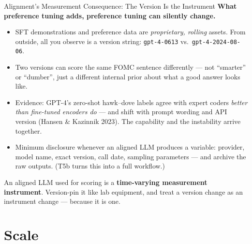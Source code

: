 \begin{frame}{Alignment's Measurement Consequence: The Version Is the Instrument}
\textbf{What preference tuning adds, preference tuning can silently change.}
\begin{itemize}
\item SFT demonstrations and preference data are \emph{proprietary, rolling} assets. From outside, all you observe is a version string: \texttt{gpt-4-0613} vs.\ \texttt{gpt-4-2024-08-06}.
\item Two versions can score the same FOMC sentence differently --- not ``smarter'' or ``dumber'', just a different internal prior about what a good answer looks like.
\item Evidence: GPT-4's zero-shot hawk--dove labels agree with expert coders \emph{better than fine-tuned encoders do} --- and shift with prompt wording and API version (Hansen \& Kazinnik 2023). The capability and the instability arrive together.
\item Minimum disclosure whenever an aligned LLM produces a variable: provider, model name, exact version, call date, sampling parameters --- and archive the raw outputs. (T5b turns this into a full workflow.)
\end{itemize}
\medskip
\begin{takeawaybox}
An aligned LLM used for scoring is a \textbf{time-varying measurement instrument}. Version-pin it like lab equipment, and treat a version change as an instrument change --- because it is one.
\end{takeawaybox}
\end{frame}

\section{Scale}

